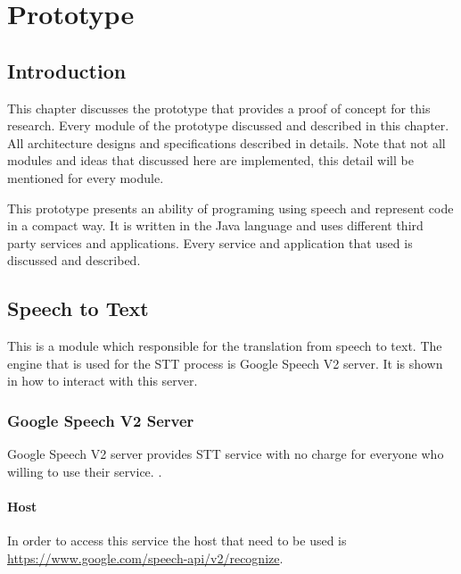\chapter{Prototype}
\section{Introduction}
This chapter discusses the prototype that provides a proof of concept for this research. Every module of the prototype discussed and described in this chapter. All architecture designs and specifications described in details. Note that not all modules and ideas that discussed here are implemented, this detail will be mentioned for every module.

This prototype presents an ability of programing using speech and represent code in a compact way. It is written in the Java language and uses different third party services and applications. Every service and application that used is discussed and described.

\section{Speech to Text}
This is a module which responsible for the translation from speech to text. The engine that is used for the STT process is Google Speech V2 server. It is shown in \citet{google15} how to interact with this server.
\subsection{Google Speech V2 Server}
Google Speech V2 server provides STT service with no charge for everyone who willing to use their service.
.
\subsubsection{Host}
In order to access this service the host that need to be used is \url{https://www.google.com/speech-api/v2/recognize}.
